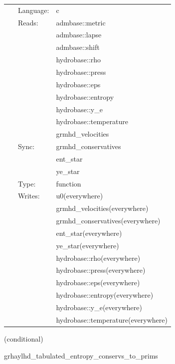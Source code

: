 \documentclass{article}
\begin{document}
 \begin{tabular*}{160mm}{cll} 
~ & Language:  & c \\ 
~ & Reads:  & admbase::metric \\ 
~& ~ &admbase::lapse\\ 
~& ~ &admbase::shift\\ 
~& ~ &hydrobase::rho\\ 
~& ~ &hydrobase::press\\ 
~& ~ &hydrobase::eps\\ 
~& ~ &hydrobase::entropy\\ 
~& ~ &hydrobase::y\_e\\ 
~& ~ &hydrobase::temperature\\ 
~& ~ &grmhd\_velocities\\ 
~ & Sync:  & grmhd\_conservatives \\ 
~& ~ &ent\_star\\ 
~& ~ &ye\_star\\ 
~ & Type:  & function \\ 
~ & Writes:  & u0(everywhere) \\ 
~& ~ &grmhd\_velocities(everywhere)\\ 
~& ~ &grmhd\_conservatives(everywhere)\\ 
~& ~ &ent\_star(everywhere)\\ 
~& ~ &ye\_star(everywhere)\\ 
~& ~ &hydrobase::rho(everywhere)\\ 
~& ~ &hydrobase::press(everywhere)\\ 
~& ~ &hydrobase::eps(everywhere)\\ 
~& ~ &hydrobase::entropy(everywhere)\\ 
~& ~ &hydrobase::y\_e(everywhere)\\ 
~& ~ &hydrobase::temperature(everywhere)\\ 
\end{tabular*} 


\vspace{5mm}

   (conditional) 

\hspace{5mm} grhaylhd\_tabulated\_entropy\_conservs\_to\_prims 

\hspace{5mm}{\it entropy+tabulated version of grhaylhd\_conservs\_to\_prims } 


\hspace{5mm}
\end{document}
